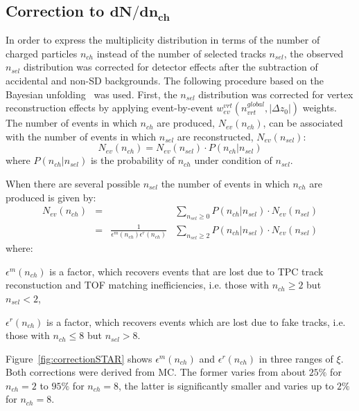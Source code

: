 \subsection[Correction to $dN/dn_{ch}$]{Correction to $\mathbf{dN/dn_{ch}}$}\label{section:star_dNdnch}
In order to express the multiplicity distribution in terms of the number of charged particles $n_{ch}$ instead of the number of selected tracks $n_{sel}$,  the observed $n_{sel}$ distribution was corrected for detector effects after the subtraction of accidental and non-SD backgrounds. The  following procedure based on the Bayesian unfolding~\cite{unfolding:2016mok,unfolding:DAgostini} was used. First, the $n_{sel}$ distribution was corrected for vertex reconstruction effects by applying event-by-event $w_{ev}^{vrt}(n_{vrt}^{global},|\Delta z_0|)$ weights. The number of events in which $n_{ch}$ are produced, $N_{ev}(n_{ch})$, can be associated with the number of events in which $n_{sel}$ are reconstructed, $N_{ev}(n_{sel})$:
\begin{equation}
N_{ev}\left(n_{ch}\right)=N_{ev}\left(n_{sel}\right)\cdot P\left(n_{ch}|n_{sel}\right)
\end{equation}
where $P(n_{ch}|n_{sel})$ is the  probability of $n_{ch}$ under condition of $n_{sel}$.


When  there are several possible $n_{sel}$ the number of events in which $n_{ch}$ are produced is given by:
\begin{equation}
\begin{array}{ccccc}
N_{ev}(n_{ch})&=&&\sum_{n_{sel}\geq0}P(n_{ch}|n_{sel})\cdot N_{ev}(n_{sel})\\
&=&\frac{1}{\epsilon^{m}(n_{ch})\epsilon^{r}(n_{ch})}&\sum_{n_{sel}\geq2}P(n_{ch}|n_{sel})\cdot N_{ev}(n_{sel})
\end{array}
\end{equation}
where:
\begin{description}
	\item $\epsilon^{m}(n_{ch})$ is a factor, which recovers events that are lost due to TPC track reconstuction and  TOF matching inefficiencies, i.e. those with $n_{ch}\geq2$ but $n_{sel}<2$,
	\item $\epsilon^{r}(n_{ch})$ is a factor, which recovers  events which are lost due to fake tracks, i.e. those with $n_{ch}\leq 8$ but $n_{sel}> 8$.
\end{description}
Figure~\ref{fig:correctionSTAR} shows $\epsilon^{m}(n_{ch})$ and $\epsilon^{r}(n_{ch})$ in three ranges of $\xi$. Both corrections were derived from MC. The former varies from about $25\%$ for $n_{ch}=2$ to $95\%$ for $n_{ch}=8$, the latter is significantly smaller and varies up to $2\%$ for $n_{ch}=8$.


